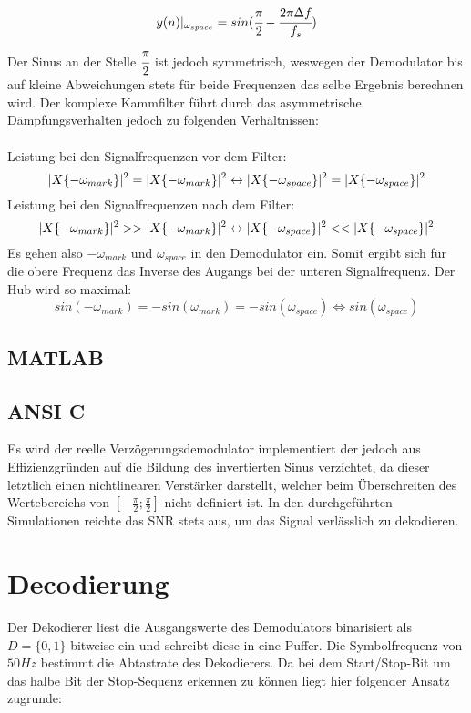 \documentclass{article}
\begin{document}
$$
y(n)\arrowvert_{\omega_{space}} = sin(\cfrac{\pi}{2}-\cfrac{2 \pi \Delta f}{f_s})
$$
Der Sinus an der Stelle $\cfrac{\pi}{2}$ ist jedoch symmetrisch, weswegen der Demodulator bis auf kleine Abweichungen stets für beide Frequenzen das selbe Ergebnis berechnen wird. Der komplexe Kammfilter führt durch das asymmetrische Dämpfungsverhalten jedoch zu folgenden Verhältnissen:\\\\
Leistung bei den Signalfrequenzen vor dem Filter:
$$
\arrowvert X \{ -\omega_{mark} \} \arrowvert^2 = \arrowvert X \{ -\omega_{mark} \} \arrowvert^2 \leftrightarrow \arrowvert X \{ -\omega_{space} \} \arrowvert^2 = \arrowvert X \{ -\omega_{space} \} \arrowvert^2
$$
Leistung bei den Signalfrequenzen nach dem Filter:
$$
\arrowvert X \{ -\omega_{mark} \} \arrowvert^2 >> \arrowvert X \{ -\omega_{mark} \} \arrowvert^2 \leftrightarrow \arrowvert X \{ -\omega_{space} \} \arrowvert^2 << \arrowvert X \{ -\omega_{space} \} \arrowvert^2
$$
Es gehen also $-\omega_{mark}$ und $\omega_{space}$ in den Demodulator ein.
Somit ergibt sich für die obere Frequenz das Inverse des Augangs bei der unteren Signalfrequenz. Der Hub wird so maximal:
$$
sin(-\omega_{mark}) = -sin(\omega_{mark}) = -sin(\omega_{space}) \Longleftrightarrow sin(\omega_{space})
$$
\subsection{MATLAB}

\subsection{ANSI C}
Es wird der reelle Verzögerungsdemodulator implementiert der jedoch aus Effizienzgründen auf die Bildung des invertierten Sinus verzichtet, da dieser letztlich einen nichtlinearen Verstärker darstellt, welcher beim Überschreiten des Wertebereichs von $[-\frac{\pi}{2};\frac{\pi}{2}]$ nicht definiert ist. In den durchgeführten Simulationen reichte das SNR stets aus, um das Signal verlässlich zu dekodieren.
\section{Decodierung}

Der Dekodierer liest die Ausgangswerte des Demodulators binarisiert als $D = \{0,1\}$ bitweise ein und schreibt diese in eine Puffer. 
Die Symbolfrequenz von $50Hz$ bestimmt die Abtastrate des Dekodierers. Da bei dem Start/Stop-Bit um das
halbe Bit der Stop-Sequenz erkennen zu können liegt hier folgender Ansatz zugrunde:
\end{document}
